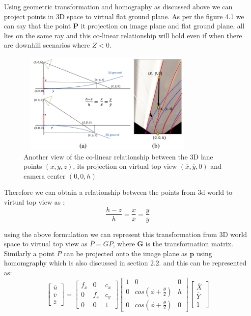     Using geometric transformation and homography as discussed above we can project points in 3D space to virtual flat ground plane. As per the figure 4.1 we can say that the point \textbf{P} it projection on image plane and flat ground plane, all lies on the same ray and this co-linear relationship will hold even if when there are downhill scenarios where $Z<0$. 
    
      \begin{figure}[h]
    \centering
    \includegraphics[width=9cm, height=5cm]{images/collinear_3dlane.png}
    \caption{Another view of the co-linear relationship between the 3D lane points $(x,y,z)$, its projection on virtual top view $(\overline{x}, \overline{y},0)$ and camera center $(0,0,h)$ \cite{guo2020gen}}
    \end{figure}

    Therefore we can obtain a relationship between the points from 3d world to virtual top view as :
    \begin{equation}
        \frac{h-z}{h} =\frac{x}{\overline{x}}=\frac{y}{\overline{y}} 
    \end{equation}
    
    using the above formulation we can represent this transformation from 3D world space to virtual top view as \textbf{$\overline{P} = GP$}, where \textbf{G} is the transformation matrix. Similarly a point \textbf{$\overline{P}$} can be projected onto the image plane as $\textbf{p}$ using homomgraphy which is also discussed in section 2.2. and this can be represented as: 
    \begin{equation}
       \begin{bmatrix}\overline{u}  \\\overline{v} \\ \overline{z}\end{bmatrix} = \begin{bmatrix} f_{x} & 0& c_{x}  \\0 &f_{x} & c_{y} \\ 0 & 0 & 1     \end{bmatrix}\begin{bmatrix} 1 & 0& 0  \\0 &cos(\phi+ \frac{\theta}{2}) & h \\ 0 &cos(\phi+ \frac{\theta}{2}) & 0     \end{bmatrix}\begin{bmatrix}\overline{X}  \\\overline{Y} \\ 1\end{bmatrix}
    \end{equation}

